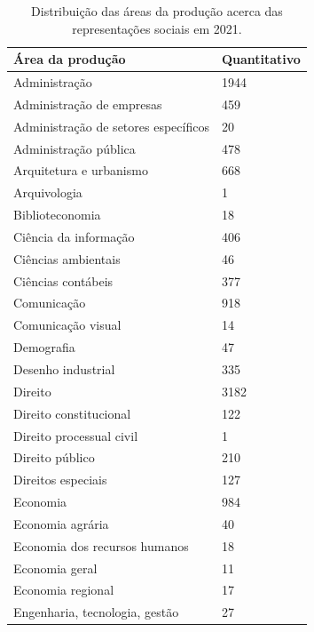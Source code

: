 \documentclass[
   article,       %
   11pt,          %
   oneside,       %
   a4paper,       %
   english,       %
   brazil,           %
   sumario=tradicional
   ]{abntex2}
\begin{document}


\partanexos

\begin{table}[htb]
\centering
\caption{Distribuição das áreas da produção acerca das representações sociais em 2021.}
\label{tab-nivinv}
\begin{tabular}{p{8.0cm}|p{4.0cm}}
   \textbf{Área da produção} & \textbf{Quantitativo} \\
   \hline
   Administração  &  1944 \\
   \hline
   Administração de empresas  &  459 \\
   \hline
   Administração de setores específicos  &  20 \\
   \hline
   Administração pública  &  478 \\
   \hline
   Arquitetura e urbanismo  &  668 \\
   \hline
   Arquivologia  &  1 \\
   \hline
   Biblioteconomia  &  18 \\
   \hline
   Ciência da informação  &  406 \\
   \hline
   Ciências ambientais  &  46 \\
   \hline
   Ciências contábeis  &  377 \\
   \hline
   Comunicação  &  918 \\
   \hline
   Comunicação visual  &  14 \\
   \hline
   Demografia  &  47 \\
   \hline
   Desenho industrial  &  335 \\
   \hline
   Direito  &  3182 \\
   \hline
   Direito constitucional  &  122 \\
   \hline
   Direito processual civil  &  1 \\
   \hline
   Direito público  &  210 \\
   \hline
   Direitos especiais  &  127 \\
   \hline
   Economia  &  984 \\
   \hline
   Economia agrária  &  40 \\
   \hline
   Economia dos recursos humanos  &  18 \\
   \hline
   Economia geral  &  11 \\
   \hline
   Economia regional  &  17 \\
   \hline
   Engenharia, tecnologia, gestão  &  27 \\

\end{tabular}
\end{table}
\end{document}

